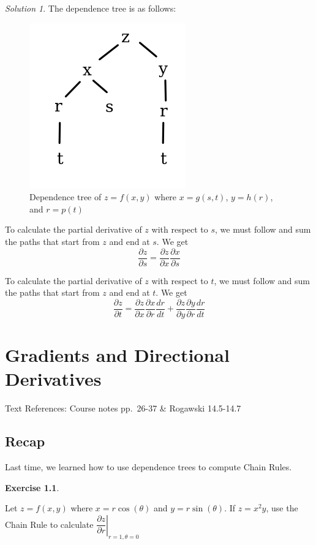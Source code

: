 \documentclass[
]{book}
\theoremstyle{definition}
\theoremstyle{definition}
\theoremstyle{definition}
\newtheorem{exercise}{Exercise}[chapter]
\theoremstyle{definition}
\theoremstyle{remark}
\newtheorem*{solution}{Solution}
\begin{document}
\begin{solution}

The dependence tree is as follows:

\begin{figure}

{\centering \includegraphics[width=0.2\linewidth]{images/ex-dt} 

}

\caption{Dependence tree of $z=f(x,y)$ where $x=g(s,t)$, $y=h(r)$, and $r=p(t)$}\label{fig:unnamed-chunk-14}
\end{figure}

To calculate the partial derivative of \(z\) with respect to \(s\), we must follow and sum the paths that start from \(z\) and end at \(s\). We get \[\dfrac{\partial z}{\partial s} = \dfrac{\partial z}{\partial x}\dfrac{\partial x}{\partial s}\]

To calculate the partial derivative of \(z\) with respect to \(t\), we must follow and sum the paths that start from \(z\) and end at \(t\). We get \[\dfrac{\partial z}{\partial t} = \dfrac{\partial z}{\partial x}\dfrac{\partial x}{\partial r}\dfrac{dr}{dt}+\dfrac{\partial z}{\partial y}\dfrac{\partial y}{\partial r}\dfrac{dr}{dt}\]

\end{solution}

\hypertarget{lec-7}{%
\chapter{Gradients and Directional Derivatives}\label{lec-7}}

Text References: Course notes pp.~26-37 \& Rogawski 14.5-14.7

\hypertarget{recap-5}{%
\section{Recap}\label{recap-5}}

Last time, we learned how to use dependence trees to compute Chain Rules.

\begin{exercise}
\protect\hypertarget{exr:unlabeled-div-46}{}\label{exr:unlabeled-div-46}

Let \(z=f(x,y)\) where \(x=r\cos(\theta)\) and \(y=r\sin(\theta)\). If \(z=x^2y\), use the Chain Rule to calculate \(\left. \dfrac{\partial z}{\partial r} \right|_{r=1,\theta=0}\)

\end{exercise}
\end{document}
